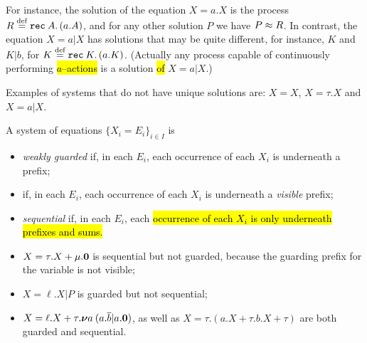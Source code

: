For instance, the solution of the equation $X = a. X$ 
is the process
$R \stackrel{\mbox{\scriptsize def}}{=} {\tt rec}\: A . \, (a. A)$, and for any other solution $P$ we have $P \approx R$.
In contrast, the equation 
 $X = a|  X$ has solutions that may be quite different, for instance,
 $K$ and $K | b$, for $K \stackrel{\mbox{\scriptsize def}}{=} {\tt rec}\: K . \, (a. K)$. (Actually any process capable of
continuously performing \hl{$a$--actions} is a solution \hl{of} $X = a|  X$.)

%
%
Examples of systems that do not have unique solutions are: $X = X$, $X
= \tau . X$ and $X = a | X$.

\begin{definition}
\label{def:guardness}
A system of equations $\{ X_i = E_i\}_{i\in I}$ is 
\begin{itemize}
\item \emph{weakly guarded} if, in each $E_i$, each occurrence of
  each $X_i$ is underneath a prefix;

\item {} if, in each $E_i$, each occurrence of
  each $X_i$ is underneath a \emph{visible} prefix;


\item \emph{sequential} if, in each $E_i$, each
  \hl{occurrence of each $X_i$ is only underneath prefixes and sums.}
\end{itemize}
\end{definition}

\begin{itemize}
\item $X = \tau. X + \mu . {\boldsymbol 0}$ is sequential but not 
 guarded, because the guarding prefix for the variable
is not visible;
\item $X =  \ell . X | P$ is guarded but not sequential;
\item $X =  \ell . X + \tau. {\boldsymbol \nu} a\: (a .\overline{b} | a.{\boldsymbol 0})$, as well as
$X = \tau . (a. X + \tau . b .X + \tau  )$ are both guarded and sequential.
\end{itemize}

